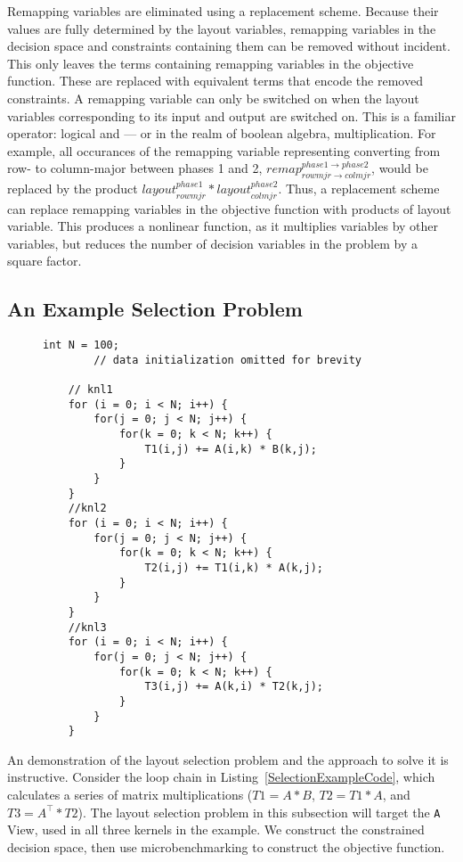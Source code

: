 Remapping variables are eliminated using a replacement scheme. 
Because their values are fully determined by the layout variables, remapping variables in the decision space and constraints containing them can be removed without incident.
This only leaves the terms containing remapping variables in the objective function.
These are replaced with equivalent terms that encode the removed constraints.
A remapping variable can only be switched on when the layout variables corresponding to its input and output are switched on.
This is a familiar operator: logical and --- or in the realm of boolean algebra, multiplication.
For example, all occurances of the remapping variable representing converting from row- to column-major between phases 1 and 2, $remap_{rowmjr \rightarrow colmjr}^{phase1 \rightarrow phase2}$, would be replaced by the product $layout_{rowmjr}^{phase1} * layout_{colmjr}^{phase2}$.
Thus, a replacement scheme can replace remapping variables in the objective function with products of layout variable.
This produces a nonlinear function, as it multiplies variables by other variables, but reduces the number of decision variables in the problem by a square factor.

\subsection{An Example Selection Problem}\label{exampleSelectionSection}
\begin{figure}
	\begin{lstlisting}[caption={Example loop chain. The selection problem targets the \texttt{A} array. Code is shown using standard C++ for loops rather than RAJA kernels for the reader's familiarity. All data is assumed to be initialized to $N \times N$ in row-major layout.},label=SelectionExampleCode]
		int N = 100;
		// data initialization omitted for brevity
	
	// knl1
	for (i = 0; i < N; i++) {
		for(j = 0; j < N; j++) {
			for(k = 0; k < N; k++) {
				T1(i,j) += A(i,k) * B(k,j);
			}
		}
	}
	//knl2
	for (i = 0; i < N; i++) {
		for(j = 0; j < N; j++) {
			for(k = 0; k < N; k++) {
				T2(i,j) += T1(i,k) * A(k,j);
			}
		}
	}
	//knl3
	for (i = 0; i < N; i++) {
		for(j = 0; j < N; j++) {
			for(k = 0; k < N; k++) {
				T3(i,j) += A(k,i) * T2(k,j);
			}
		}
	}
\end{lstlisting}
\end{figure}

An demonstration of the layout selection problem and the approach to solve it is instructive.
Consider the loop chain in Listing~\ref{SelectionExampleCode}, which calculates a series of matrix multiplications ($T1 = A * B$, $T2 = T1 * A$, and $T3 = A^\top * T2$).
The layout selection problem in this subsection will target the \verb.A. View, used in all three kernels in the example.
We construct the constrained decision space, then use microbenchmarking to construct the objective function.


